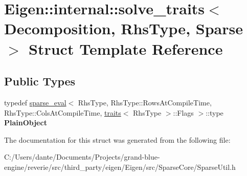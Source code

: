 \hypertarget{struct_eigen_1_1internal_1_1solve__traits_3_01_decomposition_00_01_rhs_type_00_01_sparse_01_4}{}\section{Eigen\+::internal\+::solve\+\_\+traits$<$ Decomposition, Rhs\+Type, Sparse $>$ Struct Template Reference}
\label{struct_eigen_1_1internal_1_1solve__traits_3_01_decomposition_00_01_rhs_type_00_01_sparse_01_4}
\subsection*{Public Types}
\begin{DoxyCompactItemize}
\item 
\mbox{\label{struct_eigen_1_1internal_1_1solve__traits_3_01_decomposition_00_01_rhs_type_00_01_sparse_01_4_a13429a22c8c4dcf69f196b594bbecd7e}} 
typedef \mbox{\hyperlink{struct_eigen_1_1internal_1_1sparse__eval}{sparse\+\_\+eval}}$<$ Rhs\+Type, Rhs\+Type\+::\+Rows\+At\+Compile\+Time, Rhs\+Type\+::\+Cols\+At\+Compile\+Time, \mbox{\hyperlink{struct_eigen_1_1internal_1_1traits}{traits}}$<$ Rhs\+Type $>$\+::Flags $>$\+::type {\bfseries Plain\+Object}
\end{DoxyCompactItemize}


The documentation for this struct was generated from the following file\+:\begin{DoxyCompactItemize}
\item 
C\+:/\+Users/dante/\+Documents/\+Projects/grand-\/blue-\/engine/reverie/src/third\+\_\+party/eigen/\+Eigen/src/\+Sparse\+Core/Sparse\+Util.\+h\end{DoxyCompactItemize}
